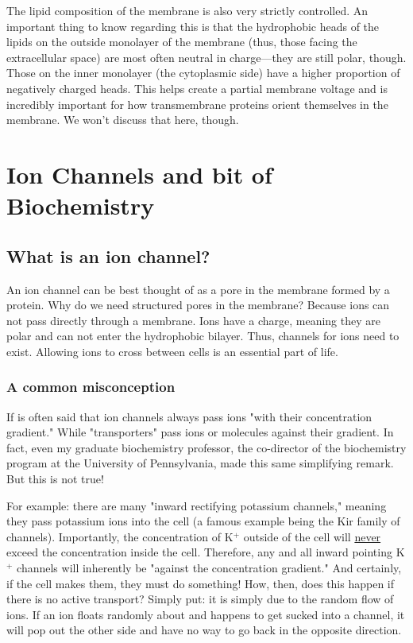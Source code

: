 \documentclass[12pt]{amsart}
\begin{document}
The lipid composition of the membrane is also very strictly controlled. An important thing to know regarding this is that the hydrophobic heads of the lipids on the outside monolayer of the membrane (thus, those facing the extracellular space) are most often neutral in charge---they are still polar, though. Those on the inner monolayer (the cytoplasmic side) have a higher proportion of negatively charged heads. This helps create a partial membrane voltage and is incredibly important for how transmembrane proteins orient themselves in the membrane. We won't discuss that here, though. 

\section{Ion Channels and bit of Biochemistry}
\subsection{What is an ion channel?} An ion channel can be best thought of as a pore in the membrane formed by a protein. Why do we need structured pores in the membrane? Because ions can not pass directly through a membrane. Ions have a charge, meaning they are polar and can not enter the hydrophobic bilayer. Thus, channels for ions need to exist. Allowing ions to cross between cells is an essential part of life. 

\subsubsection{A common misconception} If is often said that ion channels always pass ions "with their concentration gradient." While "transporters" pass ions or molecules against their gradient. In fact, even my graduate biochemistry professor, the co-director of the biochemistry program at the University of Pennsylvania, made this same simplifying remark. But this is not true!\newline 

For example: there are many "inward rectifying potassium channels," meaning they pass potassium ions into the cell (a famous example being the Kir family of channels). Importantly, the concentration of K$^+$ outside of the cell will \underline{never} exceed the concentration inside the cell. Therefore, any and all inward pointing K$^+$ channels will inherently be "against the concentration gradient." And certainly, if the cell makes them, they must do something! How, then, does this happen if there is no active transport? Simply put: it is simply due to the random flow of ions. If an ion floats randomly about and happens to get sucked into a channel, it will pop out the other side and have no way to go back in the opposite direction. 
\end{document}

